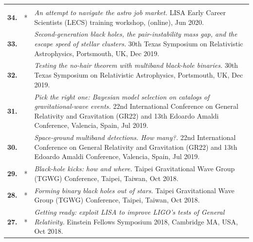 {\begin{longtable}{rp{0.3cm}p{15.8cm}}
\vspace{0.05cm}\\
%
\textbf{34.} & * & \textit{An attempt to navigate the astro job market.}
\newline{}
LISA Early Career Scientists (LECS) training workshop, (online), Jun 2020.
\vspace{0.05cm}\\
%
\textbf{33.} &  & \textit{Second-generation black holes, the pair-instability mass gap, and the escape speed of stellar clusters.}
\newline{}
30th Texas Symposium on Relativistic Astrophysics, Portsmouth, UK, Dec 2019.
\vspace{0.05cm}\\
%
\textbf{32.} &  & \textit{Testing the no-hair theorem with multiband black-hole binaries.}
\newline{}
30th Texas Symposium on Relativistic Astrophysics, Portsmouth, UK, Dec 2019.
\vspace{0.05cm}\\
%
\textbf{31.} &  & \textit{Pick the right one: Bayesian model selection on catalogs of gravitational-wave events.}
\newline{}
22nd International Conference on General Relativity and Gravitation (GR22) and 13th Edoardo Amaldi Conference, Valencia, Spain, Jul 2019.
\vspace{0.05cm}\\
%
\textbf{30.} &  & \textit{Space-ground multiband detections. How many?.}
\newline{}
22nd International Conference on General Relativity and Gravitation (GR22) and 13th Edoardo Amaldi Conference, Valencia, Spain, Jul 2019.
\vspace{0.05cm}\\
%
\textbf{29.} & * & \textit{Black-hole kicks: how and where.}
\newline{}
Taipei Gravitational Wave Group (TGWG) Conference, Taipei, Taiwan, Oct 2018.
\vspace{0.05cm}\\
%
\textbf{28.} & * & \textit{Forming binary black holes out of stars.}
\newline{}
Taipei Gravitational Wave Group (TGWG) Conference, Taipei, Taiwan, Oct 2018.
\vspace{0.05cm}\\
%
\textbf{27.} & * & \textit{Getting ready: exploit LISA to improve LIGO's tests of General Relativity.}
\newline{}
Einstein Fellows Symposium 2018, Cambridge MA, USA, Oct 2018.

\end{longtable}}
